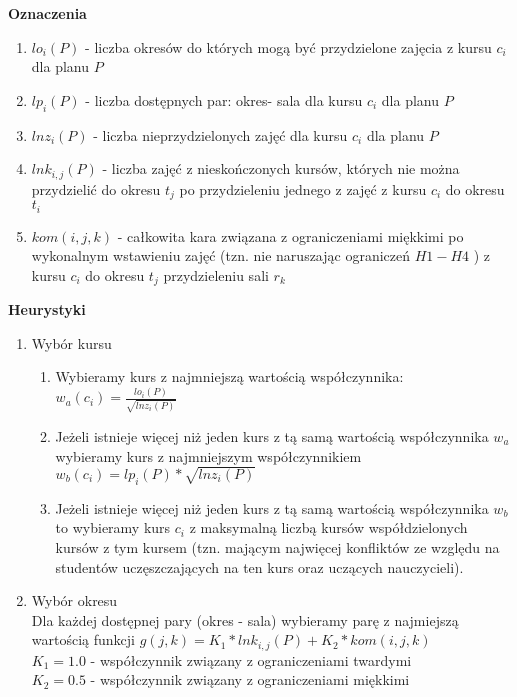 \documentclass[11pt]{report}
\begin{document}
\par \textbf{Oznaczenia}
\begin{enumerate}
\item $ lo_{i}(P)$ - liczba okresów do których mogą być przydzielone zajęcia z kursu $c_{i}$ dla planu ${P}$
\item $ lp_{i}(P)$ - liczba dostępnych par: okres- sala dla kursu ${c_{i}}$ dla planu ${P}$
\item $ lnz_{i}(P)$ - liczba nieprzydzielonych zajęć dla kursu ${c_{i}}$ dla planu ${P}$
\item $ lnk_{i, j}(P)$ - liczba zajęć z nieskończonych kursów, których nie można przydzielić do okresu ${t_{j}}$ po przydzieleniu jednego z zajęć z kursu ${c_{i}}$ do okresu ${t_{i}}$
\item $kom(i, j, k)$ - całkowita kara związana z ograniczeniami miękkimi po wykonalnym wstawieniu zajęć (tzn. nie naruszając ograniczeń $H1 - H4$ ) z kursu $c_{i}$ do okresu ${t_{j}}$ przydzieleniu sali ${r_{k}}$
\end{enumerate}
\par \textbf{Heurystyki}

\begin{enumerate}
  \item Wybór kursu 
  \begin{enumerate}
    \item Wybieramy kurs z najmniejszą wartością współczynnika:\\
     $ w_a(c_{i}) = \frac{lo_{i}(P)}{\sqrt{lnz_{i}(P)}}$
    \item Jeżeli istnieje więcej niż jeden kurs z tą samą wartością współczynnika ${w_a}$ wybieramy kurs z najmniejszym współczynnikiem \\ $ w_b(c_{i}) = lp_{i}(P) * \sqrt{lnz_{i}(P)} $
    \item Jeżeli istnieje więcej niż jeden kurs z tą samą wartością współczynnika $w_b$ to wybieramy kurs ${c_{i}}$ z maksymalną liczbą kursów współdzielonych kursów z tym kursem (tzn. mającym najwięcej konfliktów ze względu na studentów uczęszczających na ten kurs oraz uczących nauczycieli).
  \end{enumerate}
  \item Wybór okresu \\
  Dla każdej dostępnej pary (okres - sala) wybieramy parę z najmiejszą wartością funkcji $g(j, k) = K_{1} * lnk_{i,j}(P) + K_{2} * kom(i, j, k)$ \\
  $K_{1} = 1.0 $ - współczynnik związany z ograniczeniami twardymi \\
  $K_{2} = 0.5 $ - współczynnik związany z ograniczeniami miękkimi
\end{enumerate}
\end{document}
